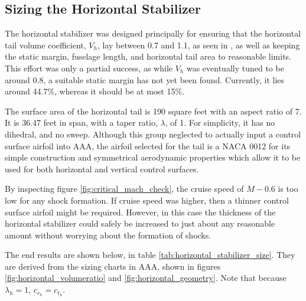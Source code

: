 \documentclass[conf]{new-aiaa}
\begin{document}
\subsection{Sizing the Horizontal Stabilizer} %

The horizontal stabilizer was designed principally for ensuring that the 
horizontal tail volume coefficient, $V_h$, lay between 0.7 and 1.1, as seen 
in \cite{orange_book}, as well as keeping the static margin, fuselage length, 
and horizontal tail area to reasonable limits. This effort was only a 
partial success, as while $V_h$ was eventually tuned to be around 0.8, a 
suitable static margin has not yet been found. Currently, it lies around 44.7\%,
whereas it should be at most 15\%.

The surface area of the horizontal tail is 190 square feet with an aspect 
ratio of 7. It is 36.47 feet in span, with a taper ratio, $\lambda$, of 1. 
For simplicity, it has no dihedral, and no sweep. Although this group 
neglected to actually input a control surface airfoil into AAA, the airfoil 
selected for the tail is a NACA 0012 for its simple construction and 
symmetrical aerodynamic properties which allow it to be used for both 
horizontal and vertical control surfaces.

By inspecting figure \ref{fig:critical_mach_check}, the cruise speed of 
$M-0.6$ is too low for any shock formation. If cruise speed was higher, 
then a thinner control surface airfoil might be required. However, in this 
case the thickness of the horizontal stabilizer could safely be increased to 
just about any reasonable amount without worrying about the formation of shocks.

The end results are shown below, in table 
\ref{tab:horizontal_stabilizer_size}. They are derived from the sizing 
charts in AAA, shown in figures \ref{fig:horizontal_volumeratio} and 
\ref{fig:horizontal_geometry}. Note that because $\lambda_h = 1$,
$c_{r_h} = c_{t_h}$.
\end{document}
